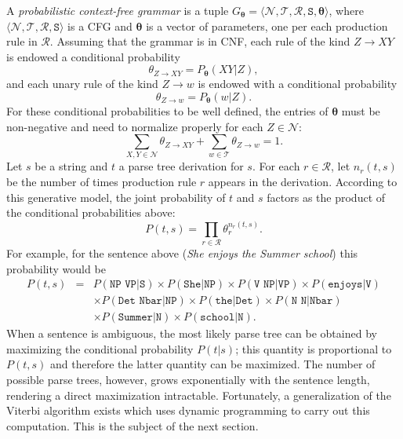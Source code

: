 A \emph{probabilistic context-free grammar} is a tuple 
$G_{\boldsymbol{\theta}} = \langle \mathcal{N}, \mathcal{T}, \mathcal{R}, \texttt{S}, \boldsymbol{\theta} \rangle$, 
where $\langle \mathcal{N}, \mathcal{T}, \mathcal{R}, \texttt{S} \rangle$ is a CFG and $\boldsymbol{\theta}$ is a vector 
of parameters, one per each production rule in $\mathcal{R}$. Assuming that the grammar is in CNF, 
each rule of the kind $Z \rightarrow X Y$ is endowed a conditional probability 
$$\theta_{Z \rightarrow X Y} = P_{\boldsymbol{\theta}}(XY | Z),$$
and each unary rule of the kind $Z \rightarrow w$ is endowed with a conditional probability 
$$\theta_{Z \rightarrow w} = P_{\boldsymbol{\theta}}(w | Z).$$
For these conditional probabilities to be well defined, the entries of $\boldsymbol{\theta}$ must be non-negative 
and need to normalize properly for each $Z \in \mathcal{N}$: 
$$\sum_{X,Y \in \mathcal{N}} \theta_{Z \rightarrow X Y} + \sum_{w \in \mathcal{T}} \theta_{Z \rightarrow w} = 1.$$
Let $s$ be a string and $t$ a parse tree derivation for $s$. 
For each $r \in \mathcal{R}$, let $n_r(t,s)$ be the number of times production rule $r$ appears in the derivation. 
According to this generative model, the joint probability of $t$ and $s$ factors as the product of 
the conditional probabilities above: 
$$P(t,s) = \prod_{r \in \mathcal{R}} \theta_r^{n_r(t,s)}.$$
For example, for the sentence above (\emph{She enjoys the Summer school}) this probability would be 
\begin{eqnarray}\label{eq:jointcfg}
P(t,s) &=& P(\texttt{NP VP}|\texttt{S}) \times P(\texttt{She}|\texttt{NP}) \times  P(\texttt{V NP}|\texttt{VP}) 
\times  P(\texttt{enjoys}|\texttt{V}) 
\nonumber\\ &&
\times  P(\texttt{Det Nbar}|\texttt{NP}) \times P(\texttt{the}|\texttt{Det}) \times P(\texttt{N N}|\texttt{Nbar}) 
\nonumber\\ &&
\times P( \texttt{Summer}|\texttt{N}) \times P(\texttt{school}|\texttt{N}).
\end{eqnarray}
When a sentence is ambiguous, the most likely parse tree can be obtained by maximizing the conditional probability $P(t|s)$; 
this quantity is proportional to $P(t,s)$ and therefore the latter quantity can be maximized. 
The number of possible parse trees, however, grows exponentially with the sentence length, rendering a direct maximization intractable. 
Fortunately, a generalization of the Viterbi algorithm exists which uses dynamic programming to carry out this computation. This 
is the subject of the next section. 



